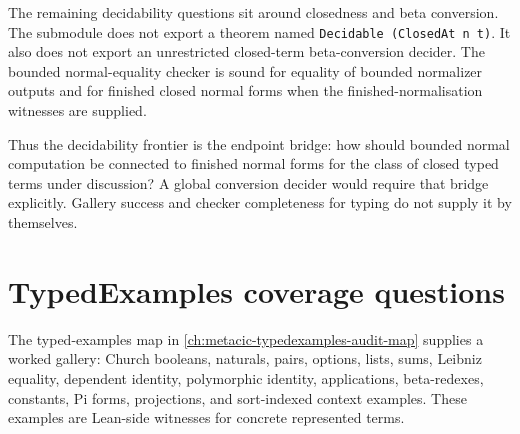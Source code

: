 The remaining decidability questions sit around closedness and beta
conversion. The submodule does not export a theorem named
\texttt{Decidable (ClosedAt n t)}. It also does not export an unrestricted
closed-term beta-conversion decider. The bounded normal-equality checker is
sound for equality of bounded normalizer outputs and for finished closed normal
forms when the finished-normalisation witnesses are supplied.

Thus the decidability frontier is the endpoint bridge: how should bounded
normal computation be connected to finished normal forms for the class of
closed typed terms under discussion? A global conversion decider would require
that bridge explicitly. Gallery success and checker completeness for typing do
not supply it by themselves.

\section{TypedExamples coverage questions}
\label{sec:metacic-open-problems-typedexamples}

The typed-examples map in \autoref{ch:metacic-typedexamples-audit-map} supplies
a worked gallery: Church booleans, naturals, pairs, options, lists, sums,
Leibniz equality, dependent identity, polymorphic identity, applications,
beta-redexes, constants, Pi forms, projections, and sort-indexed context
examples. These examples are Lean-side witnesses for concrete represented
terms.

